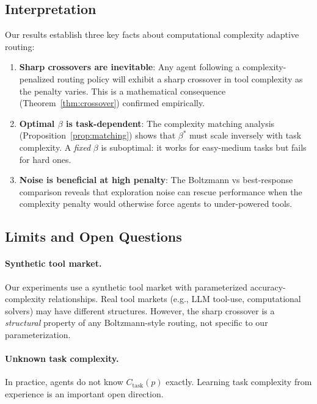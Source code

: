 \documentclass[12pt]{article}
\theoremstyle{definition}
\begin{document}
\subsection{Interpretation}

Our results establish three key facts about computational complexity adaptive routing:

\begin{enumerate}
  \item \textbf{Sharp crossovers are inevitable}: Any agent following a complexity-penalized routing policy will exhibit a sharp crossover in tool complexity as the penalty varies. This is a mathematical consequence (Theorem~\ref{thm:crossover}) confirmed empirically.

  \item \textbf{Optimal $\beta$ is task-dependent}: The complexity matching analysis (Proposition~\ref{prop:matching}) shows that $\beta^*$ must scale inversely with task complexity. A \emph{fixed} $\beta$ is suboptimal: it works for easy-medium tasks but fails for hard ones.

  \item \textbf{Noise is beneficial at high penalty}: The Boltzmann vs best-response comparison reveals that exploration noise can rescue performance when the complexity penalty would otherwise force agents to under-powered tools.
\end{enumerate}

\subsection{Limits and Open Questions}

\paragraph{Synthetic tool market.} Our experiments use a synthetic tool market with parameterized accuracy-complexity relationships. Real tool markets (e.g., LLM tool-use, computational solvers) may have different structures. However, the sharp crossover is a \emph{structural} property of any Boltzmann-style routing, not specific to our parameterization.

\paragraph{Unknown task complexity.} In practice, agents do not know $C_{\mathrm{task}}(p)$ exactly. Learning task complexity from experience is an important open direction.
\end{document}
